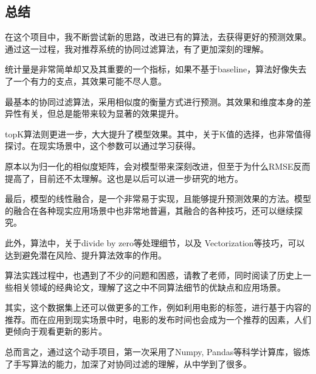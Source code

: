 \documentclass[utf8, a4paper, 11pt, onecolumn]{ctexart}
\begin{document}
\begin{spacing}{1.3}
\section{总结}

在这个项目中，我不断尝试新的思路，改进已有的算法，去获得更好的预测效果。通过这一过程，我对推荐系统的协同过滤算法，有了更加深刻的理解。

统计量是非常简单却又及其重要的一个指标，如果不基于baseline，算法好像失去了一个有力的支点，其效果可能不尽人意。

最基本的协同过滤算法，采用相似度的衡量方式进行预测。其效果和维度本身的差异性有关，但总是能带来较为显著的效果提升。

topK算法则更进一步，大大提升了模型效果。其中，关于K值的选择，也非常值得探讨。在现实场景中，这个参数可以通过学习获得。

原本以为归一化的相似度矩阵，会对模型带来深刻改进，但至于为什么RMSE反而提高了，目前还不太理解。这也是以后可以进一步研究的地方。

最后，模型的线性融合，是一个非常易于实现，且能够提升预测效果的方法。模型的融合在各种现实应用场景中也非常地普遍，其融合的各种技巧，还可以继续探究。

此外，算法中，关于divide by zero等处理细节，以及 Vectorization等技巧，可以达到避免潜在风险、提升算法效率的作用。

算法实践过程中，也遇到了不少的问题和困惑，请教了老师，同时阅读了历史上一些相关领域的经典论文，理解了这之中不同算法细节的优缺点和应用场景。

其实，这个数据集上还可以做更多的工作，例如利用电影的标签，进行基于内容的推荐。而在应用到现实场景中时，电影的发布时间也会成为一个推荐的因素，人们更倾向于观看更新的影片。

总而言之，通过这个动手项目，第一次采用了Numpy, Pandas等科学计算库，锻炼了手写算法的能力，加深了对协同过滤的理解，从中学到了很多。




\end{spacing}
\end{document}
